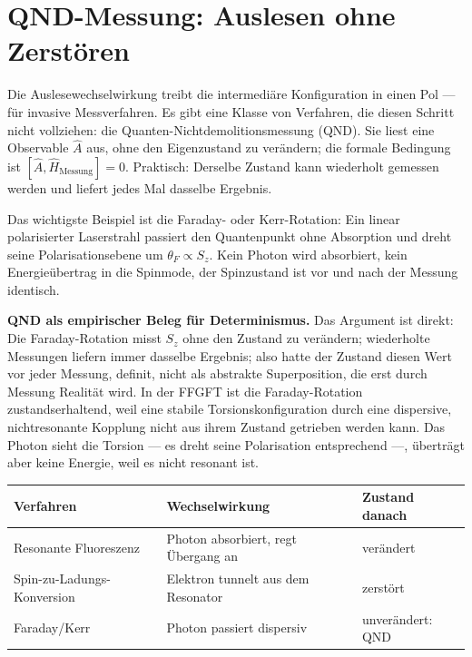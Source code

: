\section{QND-Messung: Auslesen ohne Zerstören}

Die Auslesewechselwirkung treibt die intermediäre Konfiguration in
einen Pol --- für invasive Messverfahren. Es gibt eine Klasse von
Verfahren, die diesen Schritt nicht vollziehen: die
Quanten-Nichtdemolitionsmessung (QND). Sie liest eine Observable $\hat A$
aus, ohne den Eigenzustand zu verändern; die formale Bedingung ist
$[\hat A,\hat H_{\mathrm{Messung}}] = 0$. Praktisch: Derselbe
Zustand kann wiederholt gemessen werden und liefert jedes Mal dasselbe
Ergebnis.

Das wichtigste Beispiel ist die Faraday- oder Kerr-Rotation: Ein linear
polarisierter Laserstrahl passiert den Quantenpunkt ohne Absorption und
dreht seine Polarisationsebene um $\theta_F\propto S_z$. Kein Photon wird
absorbiert, kein Energieübertrag in die Spinmode, der Spinzustand ist
vor und nach der Messung identisch.

\textbf{QND als empirischer Beleg für Determinismus.} Das Argument ist
direkt: Die Faraday-Rotation misst $S_z$ ohne den Zustand zu verändern;
wiederholte Messungen liefern immer dasselbe Ergebnis; also hatte der
Zustand diesen Wert vor jeder Messung, definit, nicht als abstrakte
Superposition, die erst durch Messung Realität wird. In der FFGFT ist
die Faraday-Rotation zustandserhaltend, weil eine stabile
Torsionskonfiguration durch eine dispersive, nichtresonante Kopplung
nicht aus ihrem Zustand getrieben werden kann. Das Photon sieht die
Torsion --- es dreht seine Polarisation entsprechend ---, überträgt aber
keine Energie, weil es nicht resonant ist.

\begin{center}
\small\renewcommand{\arraystretch}{1.3}
\begin{tabular}{p{2.4cm}p{3cm}p{2.8cm}}
\toprule
\textbf{Verfahren} & \textbf{Wechselwirkung} & \textbf{Zustand danach} \\
\midrule
Resonante Fluoreszenz & Photon absorbiert, regt Übergang an & verändert \\
Spin-zu-Ladungs-Konversion & Elektron tunnelt aus dem Resonator & zerstört \\
Faraday/Kerr & Photon passiert dispersiv & unverändert: QND \\
\bottomrule
\end{tabular}
\end{center}


